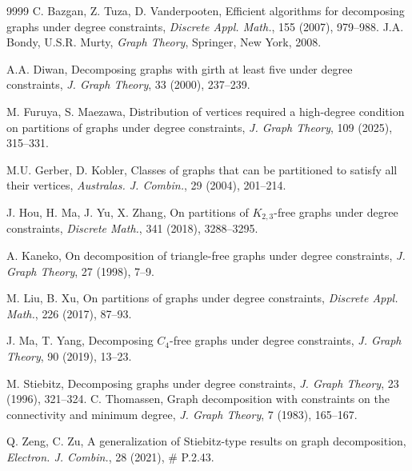 \documentclass[11p]{elsarticle}
\theoremstyle{definition}
\begin{document}
	
	 \begin{thebibliography}{9999}
   C. Bazgan, Z. Tuza, D. Vanderpooten, Efficient algorithms for decomposing graphs under degree constraints, \textit{Discrete Appl. Math.}, {155} (2007), 979--988. 
	  J.A. Bondy, U.S.R. Murty, {\em Graph Theory},  Springer, New York, 2008.
	
		
		
	
	
	   A.A. Diwan, Decomposing graphs with girth at least five under degree constraints, \textit{J. Graph Theory}, {33} (2000), 237--239.
	
	
		 M. Furuya, S. Maezawa, Distribution of vertices required a high-degree condition
	on partitions of graphs under degree constraints, \textit{J. Graph Theory}, {109} (2025),  315--331.
	
		   M.U. Gerber, D. Kobler, Classes of graphs that can be partitioned to satisfy all their vertices, \textit{Australas. J. Combin.}, {29} (2004), 201--214.
		
	   J. Hou, H. Ma, J. Yu, X. Zhang, On partitions of $ K_{2,3}$-free graphs under degree constraints,  \textit{Discrete Math.}, {341} (2018), 3288--3295.
	
	   A. Kaneko, On decomposition of triangle-free graphs under degree constraints, \textit{J. Graph Theory}, {27} (1998), 7--9.
	
	    M. Liu, B. Xu, On partitions of graphs under degree constraints, \textit{Discrete Appl. Math.}, {226} (2017), 87--93.

	
	 J. Ma, T. Yang, Decomposing $C_4$-free graphs under degree constraints, \textit{J. Graph Theory}, {90} (2019), 13--23.

	
	

		  M. Stiebitz, Decomposing graphs under degree constraints, \textit{J. Graph Theory}, {23} (1996), 321--324.
	   C. Thomassen, Graph decomposition with constraints on the connectivity and minimum degree,  \textit{J. Graph Theory}, {7} (1983), 165--167.
	
	 Q. Zeng, C. Zu, A generalization of Stiebitz-type results on graph decomposition,   \textit{Electron. J. Combin.}, {28}  (2021), \# P.2.43. 
\end{thebibliography}
 
\end{document}
